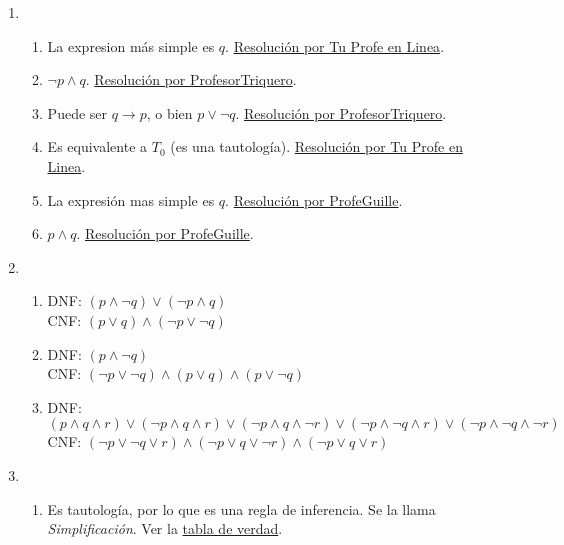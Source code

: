 \documentclass[a4paper]{article}
\newcommand{\exercise}{\item}
\newcommand{\then}{\to}
\begin{document}
\begin{enumerate}
\begin{enumerate} [label=(\alph*)]
		\item La \href{https://www.wolframalpha.com/input?i=%28%28p+and+q%29+%3D%3E+r%29%3C%3D%3E+%28p+%3D%3E+%28q+%3D%3Er%29%29}{tabla de verdad} revela que es una tautología. Por lo tanto, son equivalentes. Esta regla de equivalencia se llama Exportación.
		\item La \href{https://www.wolframalpha.com/input?i=%28%28p+or+q+%29+%3D%3E++r%29+%3C%3D%3E+%28+%28p+%3D%3E+r%29+and+%28q+%3D%3E+r%29+%29}{tabla de verdad} revela que es una tautología. Por lo tanto, son equivalentes. Esta regla de equivalencia se llama Demostración por casos.
\end{enumerate}\exercise\begin{enumerate} [label=(\alph*)]		\item La expresion más simple es $q$. \href{https://youtu.be/BOydu7cpv70}{Resolución por Tu Profe en Linea}.
		\item $\neg p \land q$. \href{https://youtu.be/p005yi28rgk?t=737}{Resolución por ProfesorTriquero}.
		\item Puede ser $q \then p$, o bien $p \lor \neg q$. \href{https://youtu.be/p005yi28rgk?t=995}{Resolución por ProfesorTriquero}.
		\item Es equivalente a $T_0$ (es una tautología). \href{https://youtu.be/BOydu7cpv70?t=586}{Resolución por Tu Profe en Linea}.
		\item La expresión mas simple es $q$. \href{https://youtu.be/KyIdCTWZuJ8}{Resolución por ProfeGuille}.
		\item $p \land q$. \href{https://youtu.be/shOOoVRqKcA}{Resolución por ProfeGuille}.
\end{enumerate}\exercise\begin{enumerate} [label=(\alph*)]		\item DNF: $(p\land \neg q) \lor  (\neg p\land q)$ \\ CNF: $(p\lor q) \land  (\neg p\lor \neg q)$
		\item DNF: $(p\land \neg q)$  \\ CNF: $(\neg p\lor \neg q) \land  (p\lor q) \land  (p\lor \neg q)$
		\item DNF: $(p\land q\land r) \lor  (\neg p\land q\land r) \lor  (\neg p\land q\land \neg r) \lor  (\neg p\land \neg q\land r) \lor  (\neg p\land \neg q\land \neg r)$  \\ CNF: $(\neg p\lor \neg q\lor r) \land  (\neg p\lor q\lor \neg r) \land  (\neg p\lor q\lor r)$
\end{enumerate}\exercise\begin{enumerate} [label=(\alph*)]		\item Es tautología, por lo que es una regla de inferencia. Se la llama \textit{Simplificación}. Ver la \href{https://www.wolframalpha.com/input?i=%28p+and+q%29+%3D%3E+p}{tabla de verdad}.

\end{enumerate}
\end{enumerate}
\end{document}
